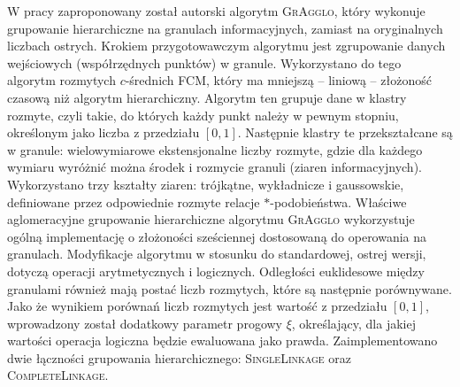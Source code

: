 \documentclass[a4paper,twoside,12pt]{book}
\newcommand{\procedura}[1]{\textsc{#1}}
\newcommand{\SingleLinkage}{\procedura{Si\-ng\-le\-Lin\-ka\-ge}}
\newcommand{\CompleteLinkage}{\procedura{Com\-ple\-te\-Lin\-ka\-ge}}
\newcommand{\MojAlg}{\procedura{GrAgglo}}
\begin{document}
W pracy zaproponowany został autorski algorytm \MojAlg{}, który wykonuje grupowanie hierarchiczne na granulach informacyjnych, zamiast na oryginalnych liczbach ostrych. 
Krokiem przygotowawczym algorytmu jest zgrupowanie danych wejściowych (współrzędnych punktów) w granule. Wykorzystano do tego algorytm rozmytych $c$-średnich FCM, który ma mniejszą -- liniową -- złożoność czasową niż algorytm hierarchiczny. Algorytm ten grupuje dane w klastry rozmyte, czyli takie, do których każdy punkt należy w pewnym stopniu, określonym jako liczba z przedziału $[0, 1]$. Następnie klastry te przekształcane są w granule: wielowymiarowe ekstensjonalne liczby rozmyte, gdzie dla każdego wymiaru wyróżnić można środek i rozmycie granuli (ziaren informacyjnych). Wykorzystano trzy kształty ziaren: trójkątne, wykładnicze i gaussowskie, definiowane przez odpowiednie rozmyte relacje $\ast$-podobieństwa.
Właściwe aglomeracyjne grupowanie hierarchiczne algorytmu \MojAlg{} wykorzystuje ogólną implementację o złożoności sześciennej dostosowaną do operowania na granulach.  Modyfikacje algorytmu w stosunku do standardowej, ostrej wersji, dotyczą operacji arytmetycznych i logicznych. Odległości euklidesowe między granulami również mają postać liczb rozmytych, które są następnie porównywane. Jako że wynikiem porównań liczb rozmytych jest wartość z przedziału $[0, 1]$, wprowadzony został dodatkowy parametr progowy $\xi$, określający, dla jakiej wartości operacja logiczna będzie ewaluowana jako prawda. Zaimplementowano dwie łączności grupowania hierarchicznego: \SingleLinkage{} oraz \CompleteLinkage{}.
\end{document}
